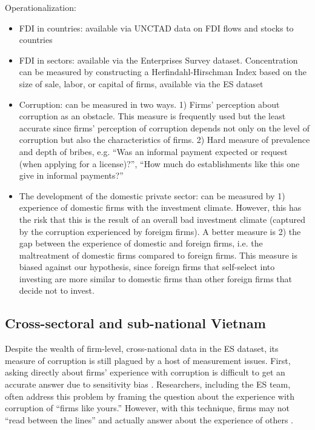 \documentclass[12pt]{article}
\begin{document}
Operationalization:
\begin{itemize}
\item FDI in countries: available via UNCTAD data on FDI flows and stocks to countries
\item FDI in sectors: available via the Enterprises Survey dataset. Concentration can be measured by constructing a Herfindahl-Hirschman Index based on the size of sale, labor, or capital of firms, available via the ES dataset
\item Corruption: can be measured in two ways. 1) Firms' perception about corruption as an obstacle. This measure is frequently used but the least accurate since firms' perception of corruption depends not only on the level of corruption but also the characteristics of firms. 2) Hard measure of prevalence and depth of bribes, e.g. ``Was an informal payment expected or request (when applying for a license)?'', ``How much do establishments like this one give in informal payments?''  

\item The development of the domestic private sector: can be measured by 1) experience of domestic firms with the investment climate. However, this has the risk that this is the result of an overall bad investment climate (captured by the corruption experienced by foreigm firms). A better measure is 2) the gap between the experience of domestic and foreign firms, i.e. the maltreatment of domestic firms compared to foreign firms. This measure is biased against our hypothesis, since foreign firms that self-select into investing are more similar to domestic firms than other foreign firms that decide not to invest.
\end{itemize}

\subsection{Cross-sectoral and sub-national Vietnam}

Despite the wealth of firm-level, cross-national data in the ES dataset, its measure of corruption is still plagued by a host of measurement issues. First, asking directly about firms' experience with corruption is difficult to get an accurate answer due to sensitivity bias \citep{Coutts2011}. Researchers, including the ES team, often address this problem by framing the question about the experience with corruption of ``firms like yours.'' However, with this technique, firms may not ``read between the lines'' and actually answer about the experience of others \citep{Ahart2004}.
\end{document}
